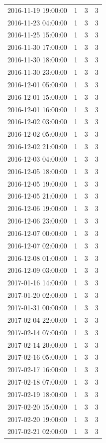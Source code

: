 \begin{tabular}{lrrr}
2016-11-19 19:00:00 & 1 & 3 & 3 \\
2016-11-23 04:00:00 & 1 & 3 & 3 \\
2016-11-25 15:00:00 & 1 & 3 & 3 \\
2016-11-30 17:00:00 & 1 & 3 & 3 \\
2016-11-30 18:00:00 & 1 & 3 & 3 \\
2016-11-30 23:00:00 & 1 & 3 & 3 \\
2016-12-01 05:00:00 & 1 & 3 & 3 \\
2016-12-01 15:00:00 & 1 & 3 & 3 \\
2016-12-01 16:00:00 & 1 & 3 & 3 \\
2016-12-02 03:00:00 & 1 & 3 & 3 \\
2016-12-02 05:00:00 & 1 & 3 & 3 \\
2016-12-02 21:00:00 & 1 & 3 & 3 \\
2016-12-03 04:00:00 & 1 & 3 & 3 \\
2016-12-05 18:00:00 & 1 & 3 & 3 \\
2016-12-05 19:00:00 & 1 & 3 & 3 \\
2016-12-05 21:00:00 & 1 & 3 & 3 \\
2016-12-06 19:00:00 & 1 & 3 & 3 \\
2016-12-06 23:00:00 & 1 & 3 & 3 \\
2016-12-07 00:00:00 & 1 & 3 & 3 \\
2016-12-07 02:00:00 & 1 & 3 & 3 \\
2016-12-08 01:00:00 & 1 & 3 & 3 \\
2016-12-09 03:00:00 & 1 & 3 & 3 \\
2017-01-16 14:00:00 & 1 & 3 & 3 \\
2017-01-20 02:00:00 & 1 & 3 & 3 \\
2017-01-31 00:00:00 & 1 & 3 & 3 \\
2017-02-04 22:00:00 & 1 & 3 & 3 \\
2017-02-14 07:00:00 & 1 & 3 & 3 \\
2017-02-14 20:00:00 & 1 & 3 & 3 \\
2017-02-16 05:00:00 & 1 & 3 & 3 \\
2017-02-17 16:00:00 & 1 & 3 & 3 \\
2017-02-18 07:00:00 & 1 & 3 & 3 \\
2017-02-19 18:00:00 & 1 & 3 & 3 \\
2017-02-20 15:00:00 & 1 & 3 & 3 \\
2017-02-20 19:00:00 & 1 & 3 & 3 \\
2017-02-21 02:00:00 & 1 & 3 & 3 \\

\end{tabular}
